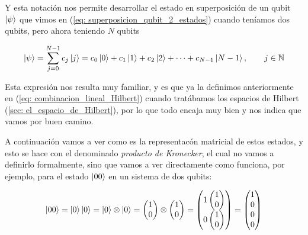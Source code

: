 \documentclass[12pt]{article}
\numberwithin{equation}{section} %
\begin{document}
    Y esta notación nos permite desarrollar el estado en superposición de un qubit \( \ket{\psi} \) que vimos en (\ref{eq: superposicion_qubit_2_estados}) cuando teníamos dos qubits, pero ahora teniendo \( N \) qubits

    \begin{equation}
        \ket{\psi} = \sum_{j = 0}^{N - 1} c_{j} \ket{j} = c_{0} \ket{0} + c_{1} \ket{1} + c_{2} \ket{2} + \cdots + c_{N - 1} \ket{N - 1}, \qquad j \in \mathbb{N} 
        \label{eq: estado_qubit_dimension_N}
    \end{equation}

    \vspace{2.5mm}

    Esta expresión nos resulta muy familiar, y es que ya la definimos anteriormente en (\ref{eq: combinacion_lineal_Hilbert}) cuando tratábamos los espacios de Hilbert (\ref{sec: el_espacio_de_Hilbert}), por lo que todo encaja muy bien y nos indica que vamos por buen camino. 

    \vspace{5mm}

    A continuación vamos a ver como es la representacón matricial de estos estados, y esto se hace con el denominado \textit{producto de Kronecker}, el cual no vamos a definirlo formalmente, sino que vamos a ver directamente como funciona, por ejemplo, para el estado \( \ket{0 0} \) en un sistema de dos qubits:

    \begin{equation*}
        \ket{0 0} = \ket{0} \ket{0} = \ket{0} \otimes \ket{0} = \begin{pmatrix}
            1 \\
            0
        \end{pmatrix} \otimes \begin{pmatrix}
            1 \\
            0
        \end{pmatrix} = \begin{pmatrix}
            1 \begin{pmatrix} 1 \\ 0 \end{pmatrix} \\
            0 \begin{pmatrix} 1 \\ 0 \end{pmatrix}
        \end{pmatrix} = \begin{pmatrix}
            1 \\
            0 \\
            0 \\
            0
        \end{pmatrix}
    \end{equation*}
\end{document}

